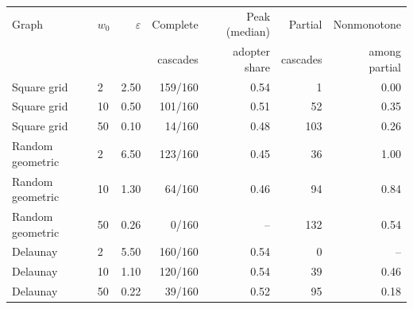 \begin{tabular}{llrrrrr}
\toprule
Graph & $w_0$ & $\varepsilon$ & Complete & Peak (median) & Partial & Nonmonotone \\
 & & & cascades & adopter share & cascades & among partial \\
\midrule
Square grid & 2 & 2.50 & 159/160 & 0.54 & 1 & 0.00 \\
Square grid & 10 & 0.50 & 101/160 & 0.51 & 52 & 0.35 \\
Square grid & 50 & 0.10 & 14/160 & 0.48 & 103 & 0.26 \\
Random geometric & 2 & 6.50 & 123/160 & 0.45 & 36 & 1.00 \\
Random geometric & 10 & 1.30 & 64/160 & 0.46 & 94 & 0.84 \\
Random geometric & 50 & 0.26 & 0/160 & -- & 132 & 0.54 \\
Delaunay & 2 & 5.50 & 160/160 & 0.54 & 0 & -- \\
Delaunay & 10 & 1.10 & 120/160 & 0.54 & 39 & 0.46 \\
Delaunay & 50 & 0.22 & 39/160 & 0.52 & 95 & 0.18 \\
\bottomrule
\end{tabular}
